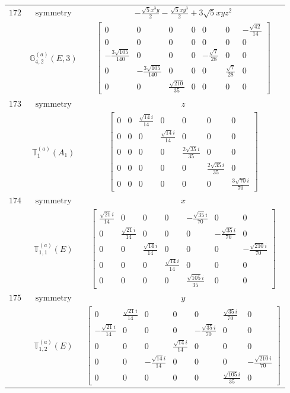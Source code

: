 \documentclass[fleqn,8pt,landscape]{jsarticle}
\begin{document}
\begin{longtable}{ccc}
$ 172 $ & $ \text{symmetry} $ & $ - \frac{\sqrt{5} x^{3} y}{2} - \frac{\sqrt{5} x y^{3}}{2} + 3 \sqrt{5} x y z^{2} $ \\
$  $ & $ \mathbb{G}_{4,2}^{(a)}(E,3) $ & $ \begin{bmatrix} 0 & 0 & 0 & 0 & 0 & 0 & - \frac{\sqrt{42}}{14} \\ 0 & 0 & 0 & 0 & 0 & 0 & 0 \\ - \frac{3 \sqrt{105}}{140} & 0 & 0 & 0 & - \frac{\sqrt{7}}{28} & 0 & 0 \\ 0 & - \frac{3 \sqrt{105}}{140} & 0 & 0 & 0 & \frac{\sqrt{7}}{28} & 0 \\ 0 & 0 & \frac{\sqrt{210}}{35} & 0 & 0 & 0 & 0 \end{bmatrix} $ \\ \hline
$ 173 $ & $ \text{symmetry} $ & $ z $ \\
$  $ & $ \mathbb{T}_{1}^{(a)}(A_{1}) $ & $ \begin{bmatrix} 0 & 0 & \frac{\sqrt{14} i}{14} & 0 & 0 & 0 & 0 \\ 0 & 0 & 0 & \frac{\sqrt{14} i}{14} & 0 & 0 & 0 \\ 0 & 0 & 0 & 0 & \frac{2 \sqrt{35} i}{35} & 0 & 0 \\ 0 & 0 & 0 & 0 & 0 & \frac{2 \sqrt{35} i}{35} & 0 \\ 0 & 0 & 0 & 0 & 0 & 0 & \frac{3 \sqrt{70} i}{70} \end{bmatrix} $ \\ \hline
$ 174 $ & $ \text{symmetry} $ & $ x $ \\
$  $ & $ \mathbb{T}_{1,1}^{(a)}(E) $ & $ \begin{bmatrix} \frac{\sqrt{21} i}{14} & 0 & 0 & 0 & - \frac{\sqrt{35} i}{70} & 0 & 0 \\ 0 & \frac{\sqrt{21} i}{14} & 0 & 0 & 0 & - \frac{\sqrt{35} i}{70} & 0 \\ 0 & 0 & \frac{\sqrt{14} i}{14} & 0 & 0 & 0 & - \frac{\sqrt{210} i}{70} \\ 0 & 0 & 0 & \frac{\sqrt{14} i}{14} & 0 & 0 & 0 \\ 0 & 0 & 0 & 0 & \frac{\sqrt{105} i}{35} & 0 & 0 \end{bmatrix} $ \\ \hline
$ 175 $ & $ \text{symmetry} $ & $ y $ \\
$  $ & $ \mathbb{T}_{1,2}^{(a)}(E) $ & $ \begin{bmatrix} 0 & \frac{\sqrt{21} i}{14} & 0 & 0 & 0 & \frac{\sqrt{35} i}{70} & 0 \\ - \frac{\sqrt{21} i}{14} & 0 & 0 & 0 & - \frac{\sqrt{35} i}{70} & 0 & 0 \\ 0 & 0 & 0 & \frac{\sqrt{14} i}{14} & 0 & 0 & 0 \\ 0 & 0 & - \frac{\sqrt{14} i}{14} & 0 & 0 & 0 & - \frac{\sqrt{210} i}{70} \\ 0 & 0 & 0 & 0 & 0 & \frac{\sqrt{105} i}{35} & 0 \end{bmatrix} $ \\ \hline

\end{longtable}
\end{document}
